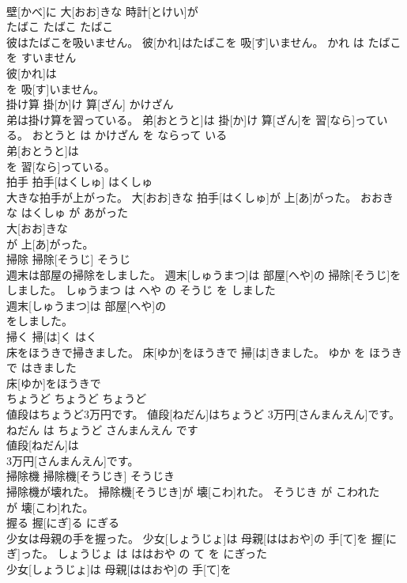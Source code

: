 \documentclass[8pt]{extreport}
\begin{document}
\begin{CJK}{UTF8}{min}
\\	壁[かべ]に 大[おお]きな 時計[とけい]が
\\	たばこ	たばこ	たばこ	
\\	彼はたばこを吸いません。	彼[かれ]はたばこを 吸[す]いません。	かれ は たばこ を すいません	
\\	彼[かれ]は
\\	を 吸[す]いません。			
\\	掛け算	掛[か]け 算[ざん]	かけざん	
\\	弟は掛け算を習っている。	弟[おとうと]は 掛[か]け 算[ざん]を 習[なら]っている。	おとうと は かけざん を ならって いる	
\\	弟[おとうと]は
\\	を 習[なら]っている。			
\\	拍手	拍手[はくしゅ]	はくしゅ	
\\	大きな拍手が上がった。	大[おお]きな 拍手[はくしゅ]が 上[あ]がった。	おおき な はくしゅ が あがった	
\\	大[おお]きな
\\	が 上[あ]がった。			
\\	掃除	掃除[そうじ]	そうじ	
\\	週末は部屋の掃除をしました。	週末[しゅうまつ]は 部屋[へや]の 掃除[そうじ]をしました。	しゅうまつ は へや の そうじ を しました	
\\	週末[しゅうまつ]は 部屋[へや]の
\\	をしました。			
\\	掃く	掃[は]く	はく	
\\	床をほうきで掃きました。	床[ゆか]をほうきで 掃[は]きました。	ゆか を ほうき で はきました	
\\	床[ゆか]をほうきで
\\	ちょうど	ちょうど	ちょうど	
\\	値段はちょうど3万円です。	値段[ねだん]はちょうど 3万円[さんまんえん]です。	ねだん は ちょうど さんまんえん です	
\\	値段[ねだん]は
\\	3万円[さんまんえん]です。			
\\	掃除機	掃除機[そうじき]	そうじき	
\\	掃除機が壊れた。	掃除機[そうじき]が 壊[こわ]れた。	そうじき が こわれた	
\\	が 壊[こわ]れた。			
\\	握る	握[にぎ]る	にぎる	
\\	少女は母親の手を握った。	少女[しょうじょ]は 母親[ははおや]の 手[て]を 握[にぎ]った。	しょうじょ は ははおや の て を にぎった	
\\	少女[しょうじょ]は 母親[ははおや]の 手[て]を

\end{CJK}
\end{document}
